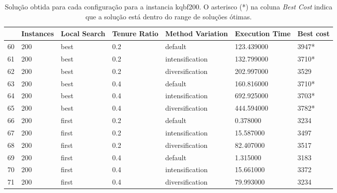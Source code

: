 \begin{table}
\centering
\begin{tabular}{lllllll}
\toprule
{} & Instances & Local Search & Tenure Ratio & Method Variation & Execution Time & Best cost \\
\midrule
60 &       200 &         best &          0.2 &          default &   123.439000 &      3947* \\
61 &       200 &         best &          0.2 &  intensification &   132.799000 &      3710* \\
62 &       200 &         best &          0.2 &  diversification &   202.997000 &      3529 \\
63 &       200 &         best &          0.4 &          default &   160.816000 &      3710* \\
64 &       200 &         best &          0.4 &  intensification &   692.925000 &      3703* \\
65 &       200 &         best &          0.4 &  diversification &   444.594000 &      3782* \\
66 &       200 &        first &          0.2 &          default &     0.378000 &      3234 \\
67 &       200 &        first &          0.2 &  intensification &    15.587000 &      3497 \\
68 &       200 &        first &          0.2 &  diversification &    82.407000 &      3517 \\
69 &       200 &        first &          0.4 &          default &     1.315000 &      3183 \\
70 &       200 &        first &          0.4 &  intensification &    15.661000 &      3372 \\
71 &       200 &        first &          0.4 &  diversification &    79.993000 &      3234 \\
\bottomrule
\end{tabular}
\caption{Solução obtida para cada configuração para a instancia kqbf200. O asterisco (*) na coluna \textit{Best Cost} indica que a solução está dentro do range de soluções ótimas.}
\label{table:all-data-5}
\end{table}

